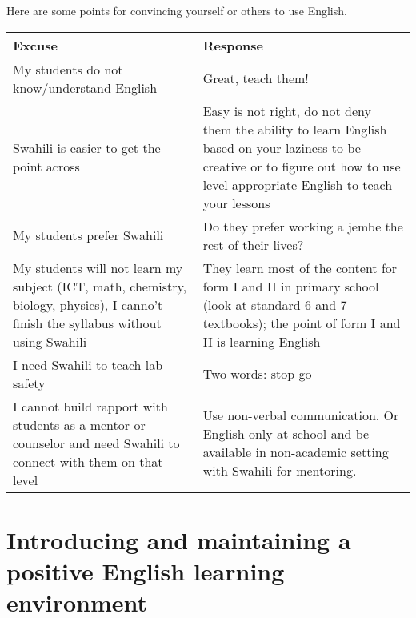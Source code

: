 Here are some points for convincing yourself or others to use English.

\begin{tabular}{|>{\raggedright}p{5cm}||>{\raggedright}p{8cm}|}
\hline 
Excuse & Response\tabularnewline
\hline 
\hline 
My students do not know/understand English & Great, teach them!\tabularnewline
\hline 
\hline 
Swahili is easier to get the point across & Easy is not right, do not deny them the ability to learn English based
on your laziness to be creative or to figure out how to use level
appropriate English to teach your lessons\tabularnewline
\hline 
\hline 
My students prefer Swahili & Do they prefer working a jembe the rest of their lives? \tabularnewline
\hline 
\hline 
My students will not learn my subject (ICT, math, chemistry, biology,
physics), I canno't finish the syllabus without using Swahili & They learn most of the content for form I and II in primary school
(look at standard 6 and 7 textbooks); the point of form I and II is
learning English\tabularnewline
\hline 
\hline 
I need Swahili to teach lab safety & Two words: \textquotedbl{}stop\textquotedbl{} \textquotedbl{}go\textquotedbl{}\tabularnewline
\hline 
\hline 
I cannot build rapport with students as a mentor or counselor and
need Swahili to connect with them on that level & Use non-verbal communication. Or English only at school and be available
in non-academic setting with Swahili for mentoring.\tabularnewline
\hline 
\end{tabular}


\section{Introducing and maintaining a positive English learning environment}

